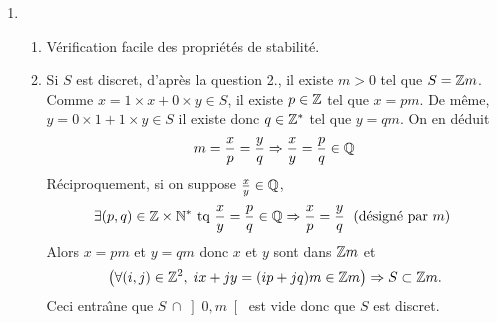 \begin{enumerate}
\begin{enumerate}
\begin{itemize}
\item $k \leq g$ alors $k \in G \,\cap\, ]0,g]$ donc $m \leq h$
\item $g<k$ alors $m < h$ car $m \leq g$.
\end{itemize}
Ceci montre bien que $m$ est un minorant de $G \,\cap\, ]0,g]$ donc le plus petit {\'e}l{\'e}ment de cet ensemble.
\item D'apr{\`e}s la d{\'e}finition d'un sous-groupe (stabilit{\'e}) $\Z m \subset G$.\newline
R{\'e}ciproquement, soit $g \in G \,\cap\, \R_+^*$. Notons $k$ la partie enti{\`e}re de $\frac{g}{m}$. On a alors
\begin{displaymath}
 k \leq \frac{g}{m}< k+1 \Rightarrow km \leq g <(k+1)m
  \Rightarrow 0\leq g-km <m
\end{displaymath}
\`A cause des propri{\'e}t{\'e}s de stabilit{\'e} de $G$, on a $-km\in G$ et $g-km \in G \,\cap\, [0,m[$. D'ap{\`e}s la d{\'e}finition de $m$, il est impossible que $g-km \in G \,\cap\, \R_+^*$. Ceci entra{\^\i}ne $g-km=0$. C'est {\`a} dire $g=km$ donc $g \in \Z m$.
\end{enumerate}
  \item
\begin{enumerate}
\item V{\'e}rification facile des propri{\'e}t{\'e}s de stabilit{\'e}.
\item Si $S$ est discret, d'apr{\`e}s la question 2., il existe $m>0$ tel que $S=\mathbb{Z} m$.\newline
Comme $x=1 \times x + 0 \times y \in S$, il existe $p \in \mathbb{Z}$ tel que $x=pm$. De m{\^e}me, $y=0 \times 1 + 1 \times y \in S$ il existe donc $q\in \mathbb{Z}^*$ tel que $y=qm$. On en d{\'e}duit
\begin{displaymath}
m=\frac{x}{p}=\frac{y}{q} \Rightarrow \frac{x}{y}=\frac{p}{q}\in \mathbb{Q} 
\end{displaymath}
R{\'e}ciproquement, si on suppose $\frac{x}{y} \in\mathbb{Q}$,
\begin{displaymath}
\exists (p,q) \in \mathbb{Z} \times \mathbb{N}^* \text{ tq } \frac{x}{y}=\frac{p}{q}\in \mathbb{Q} \Rightarrow \frac{x}{p}=\frac{y}{q} \; \text{ (désigné par $m$) }
\end{displaymath}
Alors $x=pm$ et $y=qm$ donc $x$ et $y$ sont dans $\mathbb{Z} m$ et
\[
 \left( \forall(i,j)\in \mathbb{Z}^2, \; ix+jy=(ip+jq)m \in \mathbb{Z} m\right) 
 \Rightarrow S \subset \mathbb{Z} m.
\]
Ceci entra{\^\i}ne que  $S \,\cap  \left] 0,m \right[$ est vide donc que $S$ est discret.
\end{enumerate}

\end{enumerate}
